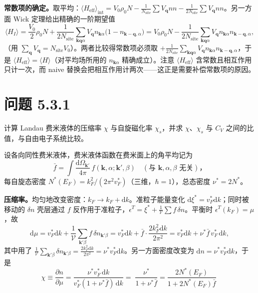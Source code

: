 \textbf{常数项的确定。}取平均：$\langle H_{\mathrm{eff}}\rangle_{\mathrm{int}}=V_0\rho_0N-\frac{1}{N_{\mathrm{site}}}\sum V_{\pmb{q}}nn-\frac{1}{2N_{\mathrm{site}}}\sum V_{\pmb{q}}nn$。另一方面 Wick 定理给出精确的一阶期望值
\begin{equation*}
\langle H_I\rangle=\frac{V_0}{2}\rho_0N+\frac{1}{2N_{\mathrm{site}}}\sum_{\pmb{k}\pmb{q}\alpha}V_{\pmb{q}}n_{\pmb{k}\alpha}\big(1-n_{\pmb{k}-\pmb{q},\alpha}\big)
=V_0\rho_0N-\frac{1}{2N_{\mathrm{site}}}\sum_{\pmb{k}\pmb{q}\alpha}V_{\pmb{q}}n_{\pmb{k}\alpha}n_{\pmb{k}-\pmb{q},\alpha},
\end{equation*}
（用 $\sum_{\pmb{q}}V_{\pmb{q}}=N_{\mathrm{site}}V_0$）。两者比较得常数项必须取 $+\frac{1}{2N_{\mathrm{site}}}\sum_{\pmb{k}\pmb{q}\alpha}V_{\pmb{q}}n_{\pmb{k}\alpha}n_{\pmb{k}-\pmb{q},\alpha}$，于是 $\langle H_{\mathrm{eff}}\rangle=\langle H\rangle$（对平均场所用的 $n_{\pmb{k}\alpha}$ 精确成立）。注意 $\langle H_{\mathrm{eff}}\rangle$ 含常数且相互作用只计一次，而 naive 替换会把相互作用计两次——这正是需要补偿常数项的原因。

\section*{问题 5.3.1}
\begin{problem}
计算 Landau 费米液体的压缩率 $\chi$ 与自旋磁化率 $\chi_s$，并求 $\chi$、$\chi_s$ 与 $C_V$ 之间的比值，与自由电子系统比较。
\end{problem}
\solution

设各向同性费米液体，费米液体函数在费米面上的角平均记为
\begin{equation*}
\bar f=\int\frac{\mathrm{d}\Omega_{\pmb{k}'}}{4\pi}\,f(\pmb{k},\alpha;\pmb{k}',\beta)
\quad(\text{与 }\pmb{k},\alpha,\beta\text{ 无关})，
\end{equation*}
每自旋态密度 $N^{*}(E_F)=k_F^{2}/(2\pi^{2}v_F^{*})$（三维，$\hbar=1$），总态密度 $\nu^{*}=2N^{*}$。

\textbf{压缩率。}均匀地改变密度：$k_F\to k_F+\mathrm{d}k$。准粒子能量变化 $\mathrm{d}\xi^{*}=v_F^{*}\mathrm{d}k$；同时被移动的 $\delta n$ 壳层通过 $f$ 反作用于准粒子，$\epsilon^{T}=\xi^{*}+\frac{1}{\mathcal V}\sum f\,\delta n$。平衡时 $\epsilon^{T}(k_F)=\mu$，故
\begin{equation*}
\mathrm{d}\mu=v_F^{*}\mathrm{d}k+\frac{1}{\mathcal V}\sum_{\pmb{k}'\beta}f\,\delta n_{\pmb{k}'\beta}
=v_F^{*}\mathrm{d}k+\bar f\cdot\frac{2k_F^{2}\mathrm{d}k}{2\pi^{2}}
=v_F^{*}\mathrm{d}k+\nu^{*}\bar f\,v_F^{*}\,\mathrm{d}k ,
\end{equation*}
其中用了 $\frac{1}{\mathcal V}\sum_{\pmb{k}'\beta}\delta n_{\pmb{k}'\beta}=\frac{2k_F^{2}\mathrm{d}k}{2\pi^{2}}=\nu^{*}v_F^{*}\mathrm{d}k$。另一方面密度改变为 $\mathrm{d}n=\nu^{*}v_F^{*}\mathrm{d}k$，于是
\begin{equation*}
\chi\equiv\frac{\partial n}{\partial\mu}
=\frac{\nu^{*}v_F^{*}\,\mathrm{d}k}{v_F^{*}(1+\nu^{*}\bar f)\,\mathrm{d}k}
=\boxed{\;\frac{\nu^{*}}{1+\nu^{*}\bar f}
=\frac{2N^{*}(E_F)}{1+2N^{*}(E_F)\bar f}\;}
\end{equation*}

